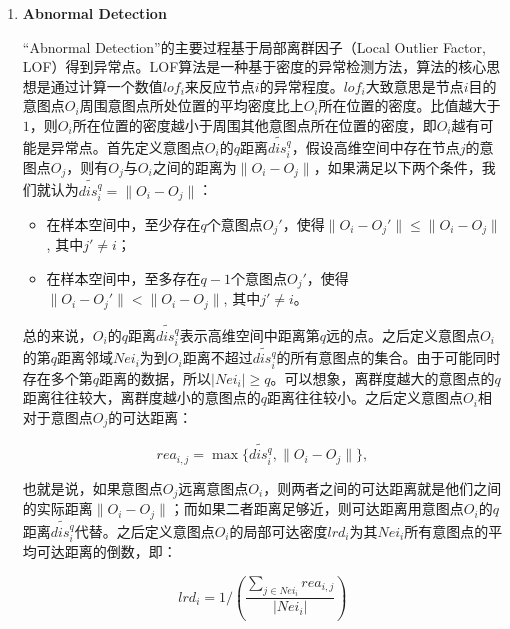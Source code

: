 \documentclass[lettersize,journal]{IEEEtran}
\begin{document}
\begin{enumerate}


\item \textbf{Abnormal Detection}

“Abnormal Detection”的主要过程基于局部离群因子（Local Outlier Factor, LOF）得到异常点。LOF算法是一种基于密度的异常检测方法，算法的核心思想是通过计算一个数值$lof_i$来反应节点$i$的异常程度。$lof_i$大致意思是节点$i$目的意图点$O_i$周围意图点所处位置的平均密度比上$O_i$所在位置的密度。比值越大于$1$，则$O_i$所在位置的密度越小于周围其他意图点所在位置的密度，即$O_i$越有可能是异常点。首先定义意图点$O_i$的$q$距离$\widetilde{dis_i^q}$，假设高维空间中存在节点$j$的意图点$O_j$，则有$O_j$与$O_i$之间的距离为$\|O_i-O_j\|$，如果满足以下两个条件，我们就认为$\widetilde{dis_i^q}=\|O_i-O_j\|$：

\begin{itemize}
    \item 在样本空间中，至少存在$q$个意图点$O_j'$，使得$\|O_i-O_j'\|\leq \|O_i-O_j\|$, 其中$j'\neq i$；
    \item 在样本空间中，至多存在$q-1$个意图点$O_j'$，使得$\|O_i-O_j'\|< \|O_i-O_j\|$, 其中$j'\neq i$。
\end{itemize}

总的来说，$O_i$的$q$距离$\widetilde{dis_i^q}$表示高维空间中距离第$q$远的点。之后定义意图点$O_i$的第$q$距离邻域$Nei_i$为到$O_i$距离不超过$\widetilde{dis_i^q}$的所有意图点的集合。由于可能同时存在多个第$q$距离的数据，所以$|Nei_i|\geq q$。可以想象，离群度越大的意图点的$q$距离往往较大，离群度越小的意图点的$q$距离往往较小。之后定义意图点$O_i$相对于意图点$O_j$的可达距离：

\begin{equation}
rea_{i,j}=\max\{\widetilde{dis_i^q}, \|O_i-O_j\|\},
\end{equation}

也就是说，如果意图点$O_j$远离意图点$O_i$，则两者之间的可达距离就是他们之间的实际距离$\|O_i-O_j\|$；而如果二者距离足够近，则可达距离用意图点$O_i$的$q$距离$\widetilde{dis_i^q}$代替。之后定义意图点$O_i$的局部可达密度$lrd_i$为其$Nei_i$所有意图点的平均可达距离的倒数，即：

\begin{equation}
lrd_i=1/(\frac{\sum_{j\in Nei_i} rea_{i,j}}{|Nei_i|})
\end{equation}


\end{enumerate}
\end{document}
